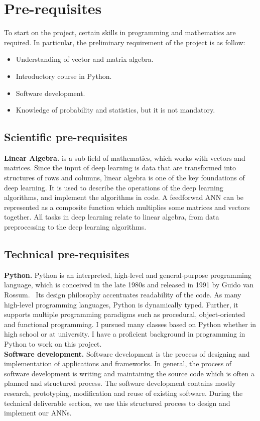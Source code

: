 
\section{Pre-requisites} 

To start on the project, certain skills in programming
and mathematics are required. In particular, the preliminary requirement of
the project is as follow:
\begin{itemize}
        \item Understanding of vector and matrix algebra.
        \item Introductory course in Python.
        \item Software development.
        \item Knowledge of probability and statistics, but it is not
                mandatory.
\end{itemize}

\subsection{Scientific pre-requisites}

\textbf{Linear Algebra.} is a sub-field of mathematics, which works with vectors
and matrices. Since the input of deep learning is data that are transformed into
structures of rows and columns, linear algebra is one of the key foundations of
deep learning. It is used to describe the operations of the deep learning
algorithms, and implement the algorithms in code. A feedforwad ANN can be
represented as a composite function which multiplies some matrices and vectors
together. All tasks in deep learning relate to linear algebra, from data
preprocessing to the deep learning algorithms.~\cite{Goodfellow-et-al-2016}

\subsection{Technical pre-requisites}

\textbf{Python.} Python is an interpreted, high-level and general-purpose
programming language, which is conceived in the late 1980s and released in 1991
by Guido van Rossum.~\cite{PyRo} Its design philosophy accentuates readability
of the code.  As many high-level programming languages, Python is dynamically
typed. Further, it supports multiple programming paradigms such as procedural,
object-oriented and functional programming. I pursued many classes based on
Python whether in high school or at university. I have a proficient background
in programming in Python to work on this project.\\

\textbf{Software development.} Software development is the process of designing
and implementation of applications and frameworks. In general, the process of
software development is writing and maintaining the source code which is often a
planned and structured process. The software development contains mostly
research, prototyping, modification and reuse of existing software. During the
technical deliverable section, we use this structured process to design and
implement our ANNs. 
